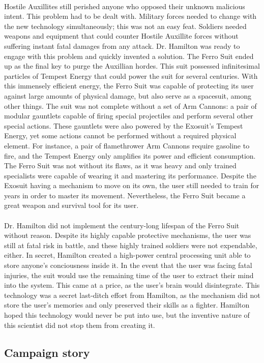 \documentclass[../Main.tex]{subfiles}
\begin{document}
\paragraph{}
Hostile Auxillites still perished anyone who opposed their unknown malicious intent. This problem had to be dealt with. Military forces needed to change with the new technology simultaneously; this was not an easy feat. Soldiers needed weapons and equipment that could counter Hostile Auxillite forces without suffering instant fatal damages from any attack. Dr. Hamilton was ready to engage with this problem and quickly invented a solution. The Ferro Suit ended up as the final key to purge the Auxillian hordes. This suit possessed infinitesimal particles of Tempest Energy that could power the suit for several centuries. With this immensely efficient energy, the Ferro Suit was capable of protecting its user against large amounts of physical damage, but also serve as a spacesuit, among other things. The suit was not complete without a set of Arm Cannons: a pair of modular gauntlets capable of firing special projectiles and perform several other special actions. These gauntlets were also powered by the Exosuit's Tempest Energy, yet some actions cannot be performed without a required physical element. For instance, a pair of flamethrower Arm Cannons require gasoline to fire, and the Tempest Energy only amplifies its power and efficient consumption. The Ferro Suit was not without its flaws, as it was heavy and only trained specialists were capable of wearing it and mastering its performance. Despite the Exosuit having a mechanism to move on its own, the user still needed to train for years in order to master its movement. Nevertheless, the Ferro Suit became a great weapon and survival tool for its user. 

\paragraph{}
Dr. Hamilton did not implement the century-long lifespan of the Ferro Suit without reason. Despite its highly capable protective mechanisms, the user was still at fatal risk in battle, and these highly trained soldiers were not expendable, either. In secret, Hamilton created a high-power central processing unit able to store anyone's conciousness inside it. In the event that the user was facing fatal injuries, the suit would use the remaining time of the user to extract their mind into the system. This came at a price, as the user's brain would disintegrate. This technology was a secret last-ditch effort from Hamilton, as the mechanism did not store the user's memories and only preserved their skills as a fighter. Hamilton hoped this technology would never be put into use, but the inventive nature of this scientist did not stop them from creating it.

\subsection{Campaign story}
\end{document}
